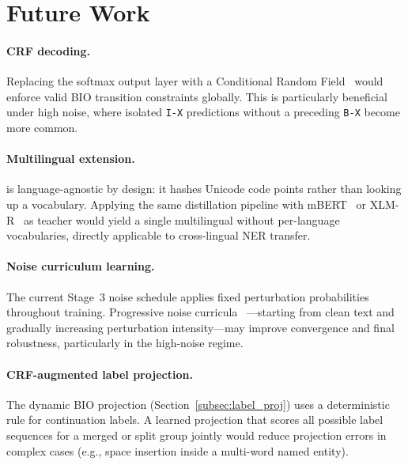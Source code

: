 \section{Future Work}
\label{sec:future}

\paragraph{CRF decoding.}
Replacing the softmax output layer with a Conditional Random
Field~\citep{lafferty2001crf} would enforce valid BIO transition constraints
globally.  This is particularly beneficial under high noise, where isolated
\texttt{I-X} predictions without a preceding \texttt{B-X} become more common.

\paragraph{Multilingual extension.}
\RetVec{} is language-agnostic by design: it hashes Unicode code points rather
than looking up a vocabulary.  Applying the same distillation pipeline with
mBERT~\citep{devlin2019bert} or XLM-R~\citep{conneau2020unsupervised} as
teacher would yield a single multilingual \LightRet{} without per-language
vocabularies, directly applicable to cross-lingual NER transfer.

\paragraph{Noise curriculum learning.}
The current Stage~3 noise schedule applies fixed perturbation probabilities
throughout training.  Progressive noise curricula~\citep{bengio2009curriculum}
---starting from clean text and gradually increasing perturbation intensity---may
improve convergence and final robustness, particularly in the high-noise regime.

\paragraph{CRF-augmented label projection.}
The dynamic BIO projection (Section~\ref{subsec:label_proj}) uses a
deterministic rule for continuation labels.  A learned projection that
scores all possible label sequences for a merged or split group jointly
would reduce projection errors in complex cases (e.g., space insertion
inside a multi-word named entity).

